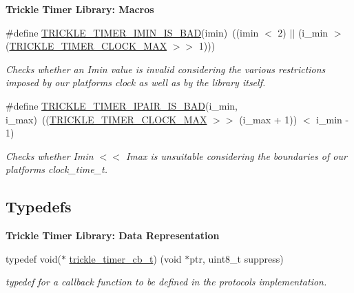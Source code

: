 \begin{Indent}{\bf Trickle Timer Library\+: Macros}
\begin{DoxyCompactItemize}
\#define \hyperlink{group__trickle-timer_ga48f0bd27341eba9602cb971642221700}{T\+R\+I\+C\+K\+L\+E\+\_\+\+T\+I\+M\+E\+R\+\_\+\+I\+M\+I\+N\+\_\+\+I\+S\+\_\+\+B\+A\+D}(imin)~((imin $<$ 2) $\vert$$\vert$ (i\+\_\+min $>$ (\hyperlink{group__trickle-timer_ga8c327f7f935dcc95d89fcbbc664fcdcf}{T\+R\+I\+C\+K\+L\+E\+\_\+\+T\+I\+M\+E\+R\+\_\+\+C\+L\+O\+C\+K\+\_\+\+M\+A\+X} $>$$>$ 1)))
\begin{DoxyCompactList}\small\item\em Checks whether an Imin value is invalid considering the various restrictions imposed by our platform\textquotesingle{}s clock as well as by the library itself. \end{DoxyCompactList}\item 
\#define \hyperlink{group__trickle-timer_ga82b7d1b4b6fb7d11da496229782a5ba7}{T\+R\+I\+C\+K\+L\+E\+\_\+\+T\+I\+M\+E\+R\+\_\+\+I\+P\+A\+I\+R\+\_\+\+I\+S\+\_\+\+B\+A\+D}(i\+\_\+min,  i\+\_\+max)~((\hyperlink{group__trickle-timer_ga8c327f7f935dcc95d89fcbbc664fcdcf}{T\+R\+I\+C\+K\+L\+E\+\_\+\+T\+I\+M\+E\+R\+\_\+\+C\+L\+O\+C\+K\+\_\+\+M\+A\+X} $>$$>$ (i\+\_\+max + 1)) $<$ i\+\_\+min -\/ 1)
\begin{DoxyCompactList}\small\item\em Checks whether Imin $<$$<$ Imax is unsuitable considering the boundaries of our platform\textquotesingle{}s clock\+\_\+time\+\_\+t. \end{DoxyCompactList}\end{DoxyCompactItemize}
\end{Indent}
\subsection*{Typedefs}
\begin{Indent}{\bf Trickle Timer Library\+: Data Representation}\par
\begin{DoxyCompactItemize}
\item 
typedef void($\ast$ \hyperlink{group__trickle-timer_ga243193848d28e6373682b8bd2e25850a}{trickle\+\_\+timer\+\_\+cb\+\_\+t}) (void $\ast$ptr, uint8\+\_\+t suppress)
\begin{DoxyCompactList}\small\item\em typedef for a callback function to be defined in the protocol\textquotesingle{}s implementation. \end{DoxyCompactList}\end{DoxyCompactItemize}
\end{Indent}
